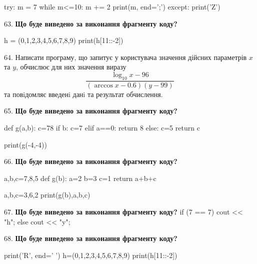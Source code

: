 \documentclass[11pt]{article}
\begin{document}
try:
    m = 7
    while m<=10:
        m += 2
    print(m, end=';')
except:
    print('Z')

\par\vspace{5mm}

63. \textbf{Що буде виведено за виконання фрагменту коду?}

h = (0,1,2,3,4,5,6,7,8,9)
print(h[11::-2])

\par\vspace{5mm}

64. 
Написати програму, що запитує у користувача значення дійсних параметрів $x$ та $y$, обчислює для них значення виразу 
$$\frac{\log_{10} x - 96}{(\arccos x - 0.6) (y - 99)}$$ 
та повiдомляє введенi данi та результат обчислення.

\par\vspace{5mm}

65. \textbf{Що буде виведено за виконання фрагменту коду?}

def g(a,b):
    c=78
    if b:
        c=7
    elif a==0:
         return 8
    else: 
        c=5
    return c

print(g(-4,-4))
\par\vspace{5mm}

66. \textbf{Що буде виведено за виконання фрагменту коду?}

a,b,c=7,8,5
def g(b):
    a=2
    b=3
    c=1
    return a+b+c

a,b,c=3,6,2
print(g(b),a,b,c)
\par\vspace{5mm}

67. \textbf{Що буде виведено за виконання фрагменту коду?}
if (7 == 7)
    cout << "h";
else
    cout << "y";

\par\vspace{5mm}

68. \textbf{Що буде виведено за виконання фрагменту коду?}

print('R', end=' ')
h=(0,1,2,3,4,5,6,7,8,9)
print(h[11::-2])

\par\vspace{5mm}
\end{document}
